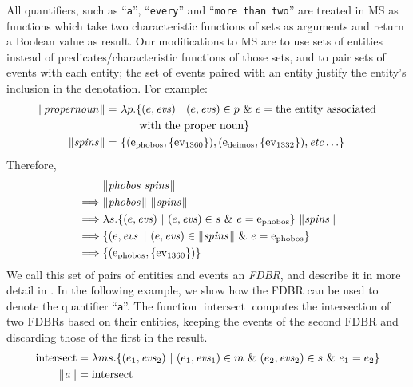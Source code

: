 \documentclass[../main.tex]{subfiles}
\begin{document}
\begin{refsection}
All quantifiers, such as ``\texttt{a}'', ``\texttt{every}'' and ``\texttt{more than two}'' are treated in MS as functions which take two characteristic functions of sets as arguments and return a Boolean value as result. Our modifications to MS are to use sets of entities instead of predicates/characteristic functions of those sets, and to pair sets of events with each entity; the set of events paired with an entity justify the entity’s inclusion in the denotation. For example:
\begin{equation*}
	\begin{split}
		\meaningof{propernoun} =&\ \lambda p.
		\{(e, \evs)\ |\ (e, \evs) \in p\ \&\ e = \dmathrm{the\ entity\ associated} \\ & \qquad \dmathrm{with\ the\ proper\ noun}\} \\
		\meaningof{spins} =&\ \{(\entityassoc{phobos}, \{\eventassoc{1360}\}), (\entityassoc{deimos}, \{\eventassoc{1332}\}), \etc\}
	\end{split}
\end{equation*}
Therefore,
\begin{equation*}
	\begin{split}
		& \meaningof{phobos spins} \\
		\implies& \meaningof{phobos}\ \meaningof{spins} \\
		\implies& \lambda s.\{(e, \evs)\ |\ (e, \evs) \in s\ \&\ e = \entityassoc{phobos}\}\ \meaningof{spins} \\
		\implies& \{(e, \evs\ |\ (e, \evs) \in \meaningof{spins}\ \&\ e = \entityassoc{phobos}\}\ \\
		\implies& \{(\entityassoc{phobos}, \{\eventassoc{1360}\})\}
	\end{split}
\end{equation*}
We call this set of pairs of entities and events an \textit{FDBR}, and describe it in more detail in .
In the following example, we show how the FDBR can be used to denote the quantifier ``\texttt{a}''.  The function $\operatorname{intersect}$ computes the intersection of two FDBRs based on their entities, keeping the events of the second FDBR and discarding those of the first in the result.
\begin{equation*}
	\begin{split}
		\operatorname{intersect} &= \lambda ms.\{(e_1,\evs_2)\ |\ (e_1,\evs_1) \in m\ \&\ (e_2,\evs_2) \in s\ \&\ e_1 = e_2\} \\
		\meaningof{a} &= \operatorname{intersect}

\end{split}
\end{equation*}
\end{refsection}
\end{document}
